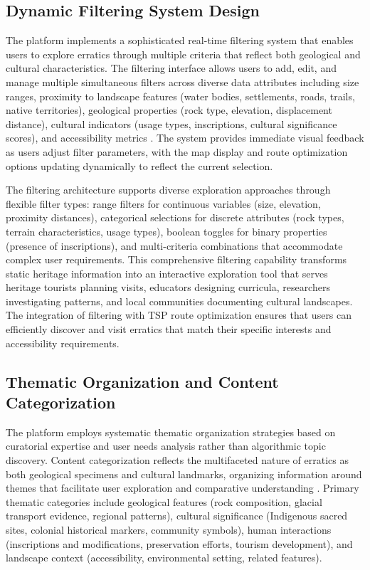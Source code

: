 \subsection{Dynamic Filtering System Design}
\label{subsec:filtering_system}

The platform implements a sophisticated real-time filtering system that enables users to explore erratics through multiple criteria that reflect both geological and cultural characteristics. The filtering interface allows users to add, edit, and manage multiple simultaneous filters across diverse data attributes including size ranges, proximity to landscape features (water bodies, settlements, roads, trails, native territories), geological properties (rock type, elevation, displacement distance), cultural indicators (usage types, inscriptions, cultural significance scores), and accessibility metrics \cite{Reimers2019}. The system provides immediate visual feedback as users adjust filter parameters, with the map display and route optimization options updating dynamically to reflect the current selection.

The filtering architecture supports diverse exploration approaches through flexible filter types: range filters for continuous variables (size, elevation, proximity distances), categorical selections for discrete attributes (rock types, terrain characteristics, usage types), boolean toggles for binary properties (presence of inscriptions), and multi-criteria combinations that accommodate complex user requirements. This comprehensive filtering capability transforms static heritage information into an interactive exploration tool that serves heritage tourists planning visits, educators designing curricula, researchers investigating patterns, and local communities documenting cultural landscapes. The integration of filtering with TSP route optimization ensures that users can efficiently discover and visit erratics that match their specific interests and accessibility requirements.

\subsection{Thematic Organization and Content Categorization}
\label{subsec:thematic_organization}

The platform employs systematic thematic organization strategies based on curatorial expertise and user needs analysis rather than algorithmic topic discovery. Content categorization reflects the multifaceted nature of erratics as both geological specimens and cultural landmarks, organizing information around themes that facilitate user exploration and comparative understanding \cite{Grootendorst2022}. Primary thematic categories include geological features (rock composition, glacial transport evidence, regional patterns), cultural significance (Indigenous sacred sites, colonial historical markers, community symbols), human interactions (inscriptions and modifications, preservation efforts, tourism development), and landscape context (accessibility, environmental setting, related features).

